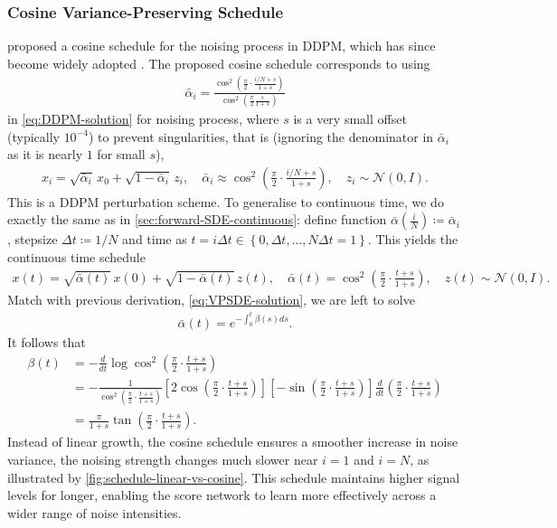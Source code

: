 \documentclass[a4paper,12pt]{article}
\begin{document}
\subsubsection*{Cosine Variance-Preserving Schedule}
\citet{nicholImprovedDenoisingDiffusion2021} proposed a cosine schedule for the noising process in DDPM, which has since become widely adopted \citep{dhariwal2021DiffusionModelsBeat,saharia2022PhotorealisticTexttoImageDiffusion,watsonNovoDesignProtein2023}. The proposed cosine schedule corresponds to using
\begin{align*}
    \bar \alpha_i = \frac{\cos^2\!\left(\frac{\pi}{2}\cdot\frac{i/N+s}{1+s}\right)}{\cos^2\!\left(\frac{\pi}{2}\frac{s}{1+s}\right)}
\end{align*}
in \cref{eq:DDPM-solution} for noising process, where \(s\) is a very small offset (typically \(10^{-4}\)) to prevent singularities, that is (ignoring the denominator in \(\bar{\alpha}_i\) as it is nearly \(1\) for small \(s\)),
\begin{align*}
    x_i=\sqrt{\bar\alpha_i}\,x_0+\sqrt{1-\bar\alpha_i}\,z_i,\quad\bar\alpha_i\approx\cos^2\!\left(\frac{\pi}{2}\cdot\frac{i/N+s}{1+s}\right),\quad z_i\sim\mathcal{N}\!\left(0, I\right).
\end{align*}
This is a DDPM perturbation scheme. To generalise to continuous time, we do exactly the same as in \cref{sec:forward-SDE-continuous}: define function \(\bar{\alpha}\!\left(\frac{i}{N}\right)\coloneq\bar\alpha_i\), stepsize \(\Delta t\coloneq 1/N\) and time as \(t=i\Delta t\in\left\{0,\Delta t,...,N\Delta t=1\right\}\). This yields the continuous time schedule
\begin{align*}
    x\!\left(t\right)=\sqrt{\bar\alpha\!\left(t\right)}\,x\!\left(0\right)+\sqrt{1-\bar\alpha\!\left(t\right)}\,z\!\left(t\right),\quad\bar\alpha\!\left(t\right)=\cos^2\left(\frac{\pi}{2}\cdot\frac{t+s}{1+s}\right),\quad z\!\left(t\right)\sim\mathcal{N}\!\left(0, I\right).
\end{align*}
Match with previous derivation, \cref{eq:VPSDE-solution}, we are left to solve
\begin{align*}
    \bar\alpha\!\left(t\right)=e^{-\int_0^t\beta(s)ds}.
\end{align*}
It follows that
\begin{align}
    \nonumber
    \beta(t)
    &=-\frac{d}{dt}\log\cos^2\left(\frac{\pi}{2}\cdot\frac{t+s}{1+s}\right)\\
    \nonumber
    &=-\frac{1}{\cos^2\left(\frac{\pi}{2}\cdot\frac{t+s}{1+s}\right)}\left[2\cos\left(\frac{\pi}{2}\cdot\frac{t+s}{1+s}\right)\right]\left[-\sin\left(\frac{\pi}{2}\cdot\frac{t+s}{1+s}\right)\right]\frac{d}{dt}\left(\frac{\pi}{2}\cdot\frac{t+s}{1+s}\right)\\
    \label{eq:cosine-beta}
    &=\frac{\pi}{1+s}\tan\left(\frac{\pi}{2}\cdot\frac{t+s}{1+s}\right).
\end{align}
Instead of linear growth, the cosine schedule ensures a smoother increase in noise variance, the noising strength changes much slower near \(i=1\) and \(i=N\), as illustrated by \cref{fig:schedule-linear-vs-cosine}. This schedule maintains higher signal levels for longer, enabling the score network to learn more effectively across a wider range of noise intensities.
\end{document}
